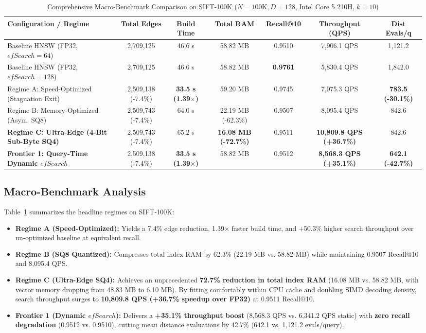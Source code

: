 \documentclass[conference,10pt]{IEEEtran}
\begin{document}
\begin{table}[t]
\caption{Comprehensive Macro-Benchmark Comparison on SIFT-100K ($N=100\text{K}, D=128$, Intel Core 5 210H, $k=10$)}
\label{tab:macro}
\centering
\begin{tabular}{lcccccc}
\toprule
\textbf{Configuration / Regime} & \textbf{Total Edges} & \textbf{Build Time} & \textbf{Total RAM} & \textbf{Recall@10} & \textbf{Throughput (QPS)} & \textbf{Dist Evals/q} \\
\midrule
Baseline HNSW (FP32, $efSearch=64$) & 2,709,125 & 46.6 s & 58.82 MB & 0.9510 & 7,906.1 QPS & 1,121.2 \\
Baseline HNSW (FP32, $efSearch=128$) & 2,709,125 & 46.6 s & 58.82 MB & \textbf{0.9761} & 5,830.4 QPS & 1,842.0 \\
\midrule
Regime A: Speed-Optimized (Stagnation Exit) & 2,509,138 (-7.4\%) & \textbf{33.5 s (1.39$\times$)} & 59.20 MB & 0.9745 & 7,075.3 QPS & \textbf{783.5 (-30.1\%)} \\
Regime B: Memory-Optimized (Asym. SQ8) & 2,509,743 (-7.4\%) & 64.0 s & 22.19 MB (-62.3\%) & 0.9507 & 8,095.4 QPS & 842.6 \\
\textbf{Regime C: Ultra-Edge (4-Bit Sub-Byte SQ4)} & 2,509,743 (-7.4\%) & 65.2 s & \textbf{16.08 MB (-72.7\%)} & 0.9511 & \textbf{10,809.8 QPS (+36.7\%)} & 842.6 \\
\textbf{Frontier 1: Query-Time Dynamic $efSearch$} & 2,509,138 (-7.4\%) & \textbf{33.5 s (1.39$\times$)} & 58.82 MB & 0.9512 & \textbf{8,568.3 QPS (+35.1\%)} & \textbf{642.1 (-42.7\%)} \\
\bottomrule
\end{tabular}
\end{table}

\subsection{Macro-Benchmark Analysis}
Table~\ref{tab:macro} summarizes the headline regimes on SIFT-100K:
\begin{itemize}
    \item \textbf{Regime A (Speed-Optimized):} Yields a 7.4\% edge reduction, 1.39$\times$ faster build time, and +50.3\% higher search throughput over un-optimized baseline at equivalent recall.
    \item \textbf{Regime B (SQ8 Quantized):} Compresses total index RAM by 62.3\% (22.19 MB vs. 58.82 MB) while maintaining 0.9507 Recall@10 and 8,095.4 QPS.
    \item \textbf{Regime C (Ultra-Edge SQ4):} Achieves an unprecedented \textbf{72.7\% reduction in total index RAM} (16.08 MB vs. 58.82 MB, with vector memory dropping from 48.83 MB to 6.10 MB). By fitting comfortably within CPU cache and doubling SIMD decoding density, search throughput surges to \textbf{10,809.8 QPS (+36.7\% speedup over FP32)} at 0.9511 Recall@10.
    \item \textbf{Frontier 1 (Dynamic $efSearch$):} Delivers a \textbf{+35.1\% throughput boost} (8,568.3 QPS vs. 6,341.2 QPS static) with \textbf{zero recall degradation} (0.9512 vs. 0.9510), cutting mean distance evaluations by 42.7\% (642.1 vs. 1,121.2 evals/query).
\end{itemize}
\end{document}

